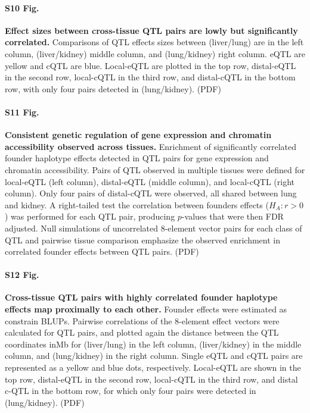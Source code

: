 \documentclass[10pt,letterpaper]{article}
\begin{document}
\paragraph*{S10 Fig.}
\label{S_qtl_effect_size_comparison}
{\bf Effect sizes between cross-tissue QTL pairs are lowly but significantly correlated.}
Comparisons of QTL effects sizes between (liver/lung) are in the left column, (liver/kidney) middle column, and (lung/kidney) right column. eQTL are yellow and cQTL are blue. Local-eQTL are plotted in the top row, distal-eQTL in the second row, local-cQTL in the third row, and distal-cQTL in the bottom row, with only four pairs detected in (lung/kidney). (PDF)

\paragraph*{S11 Fig.}
\label{S_qtl_pair_histograms}
{\bf Consistent genetic regulation of gene expression and chromatin accessibility observed across tissues.}
Enrichment of significantly correlated founder haplotype effects detected in QTL pairs for gene expression and chromatin accessibility. Pairs of QTL observed in multiple tissues were defined for local-eQTL (left column), distal-eQTL (middle column), and local-cQTL (right column). Only four pairs of distal-cQTL were observed, all shared between lung and kidney. A right-tailed test the correlation between founders effects ($H_{A}: r > 0$) was performed for each QTL pair, producing $p$-values that were then FDR adjusted. Null simulations of uncorrelated 8-element vector pairs for each class of QTL and pairwise tissue comparison emphasize the observed enrichment in correlated founder effects between QTL pairs. (PDF)

\paragraph*{S12 Fig.}
\label{S_qtl_cor_by_distance_comparison}
{\bf Cross-tissue QTL pairs with highly correlated founder haplotype effects map proximally to each other.}
Founder effects were estimated as constrain BLUPs. Pairwise correlations of the 8-element effect vectors were calculated for QTL pairs, and plotted again the distance between the QTL coordinates inMb for (liver/lung) in the left column, (liver/kidney) in the middle column, and (lung/kidney) in the right column. Single eQTL and cQTL pairs are represented as a yellow and blue dots, respectively. Local-eQTL are shown in the top row, distal-eQTL in the second row, local-cQTL in the third row, and distal c-QTL in the bottom row, for which only four pairs were detected in (lung/kidney). (PDF)
\end{document}
